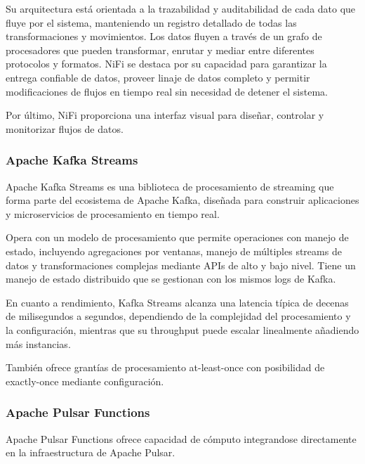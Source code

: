Su arquitectura está orientada a la trazabilidad y auditabilidad de cada dato que fluye por el sistema, 
manteniendo un registro detallado de todas las transformaciones y movimientos. Los datos fluyen 
a través de un grafo de procesadores que pueden transformar, enrutar y mediar entre diferentes protocolos y formatos. 
NiFi se destaca por su capacidad para garantizar la entrega confiable de datos, proveer linaje de datos completo y 
permitir modificaciones de flujos en tiempo real sin necesidad de detener el sistema.\newline

Por último, NiFi proporciona una interfaz visual para diseñar, controlar y 
monitorizar flujos de datos.

\newpage
\subsubsection{Apache Kafka Streams}

Apache Kafka Streams es una biblioteca de procesamiento de streaming que forma parte del ecosistema de Apache Kafka, 
diseñada para construir aplicaciones y microservicios de procesamiento en tiempo real.\newline

Opera con un modelo de procesamiento que permite operaciones con manejo de estado, incluyendo agregaciones por ventanas, manejo de múltiples streams de datos 
y transformaciones complejas mediante APIs de alto y bajo nivel. Tiene un manejo de estado distribuido que se gestionan con los mismos logs de Kafka.\newline

En cuanto a rendimiento, Kafka Streams alcanza una latencia típica de decenas de milisegundos a segundos, dependiendo de la complejidad del procesamiento y la configuración, 
mientras que su throughput puede escalar linealmente añadiendo más instancias.\newline 

También ofrece grantías de procesamiento at-least-once con posibilidad de exactly-once mediante configuración.


\subsubsection{Apache Pulsar Functions}

Apache Pulsar Functions ofrece capacidad de cómputo integrandose directamente en la infraestructura de Apache Pulsar. \newline

